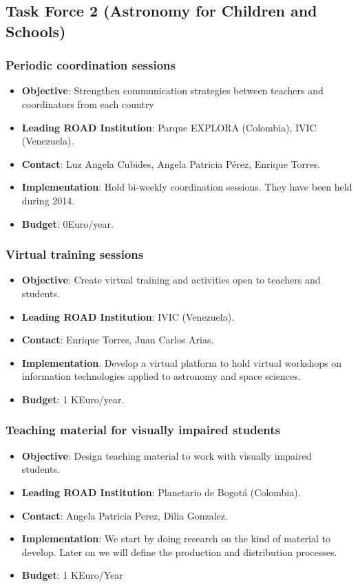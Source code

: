 \documentclass[12pt]{article}
\begin{document}
\subsection{Task Force 2 (Astronomy for Children and Schools)}


\subsubsection{Periodic coordination sessions}

\begin{itemize}

\item{\bf Objective}: Strengthen communication  strategies between
  teachers  and coordinators from each  country
\item{\bf Leading ROAD Institution}: Parque EXPLORA (Colombia), IVIC
  (Venezuela). 
\item{\bf Contact}: Luz Angela Cubides,  Angela Patricia  P\'erez,
  Enrique  Torres.
\item{\bf Implementation}: Hold bi-weekly coordination sessions. They
  have been held during 2014.
\item{\bf Budget}: 0Euro/year.
\end{itemize}


\subsubsection{Virtual training sessions}
\begin{itemize}
\item {\bf Objective}: Create virtual training and activities open to
  teachers and students. 
\item {\bf Leading ROAD Institution}: IVIC (Venezuela).
\item {\bf Contact}: Enrique Torres, Juan Carlos Arias.
\item {\bf Implementation}. Develop a virtual platform to hold virtual
  workshops on information technologies applied to astronomy and space
  sciences.
\item {\bf Budget}: 1 KEuro/year.
\end{itemize}

\subsubsection{Teaching material for visually impaired students}
\begin{itemize}
\item {\bf Objective}: Design teaching material to work with visually
  impaired students. 
\item {\bf Leading ROAD Institution}: Planetario de Bogot\'a
  (Colombia). 
\item {\bf Contact}: Angela Patricia Perez, Dilia Gonzalez. 
\item {\bf Implementation}: We start by doing research on the kind of
  material to develop. Later on we will define the production and
  distribution processes.  
\item {\bf Budget}: 1 KEuro/Year
\end{itemize}
\end{document}
